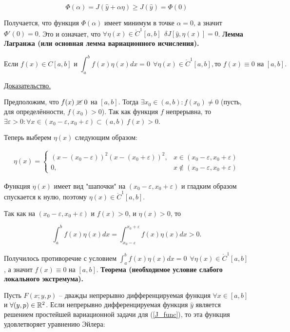 $$
\Phi(\alpha) = J(\widehat{y} + \alpha \eta) \geqslant 
J(\widehat{y}) = \Phi(0)
$$

Получается, что функция $\Phi(\alpha)$ имеет минимум в точке
$\alpha = 0$, а значит $\Phi'(0) = 0$.
Это и означает, что 
$
\forall \eta(x) \in \mathring{C}^1 [a, b] \ \ 
\delta J[\widehat{y}, \eta(x)] = 0
$.
\bigbreak
\textbf{Лемма Лагранжа (или основная лемма вариационного исчисления).}


\begin{equation*}
\text{Если } f(x) \in C [a, b] \text{ и } 
\int_a^b f(x) \eta(x) dx = 0 \ \ \forall \eta(x) \in \mathring{C}^1 [a, b],
\text{то } f(x) \equiv 0 \text{ на } [a, b].
\end{equation*}

\underline{Доказательство.}

Предположим, что $f(x) \ \cancel{\equiv}\  0$ на $[a, b]$.
Тогда $\exists x_0 \in (a, b) : f(x_0) \neq 0$ 
(пусть, для определённости, $f(x_0) > 0$).
Так как функция $f$ непрерывна, то 
$\exists \varepsilon > 0 : 
\forall x \in (x_0 - \varepsilon, x_0 + \varepsilon) \subset (a, b) \ f(x) > 0$.

Теперь выберем $\eta(x)$ следующим образом:

\begin{align*}
    \eta(x) = 
    \begin{cases}
        \left( x - (x_0 - \varepsilon) \right)^2
        \left( x - (x_0 + \varepsilon) \right)^2,
        &x \in (x_0 - \varepsilon, x_0 + \varepsilon)\\
        0, & x \notin (x_0 - \varepsilon, x_0 + \varepsilon)
    \end{cases}
\end{align*}

Функция $\eta(x)$ имеет вид "шапочки" на 
$(x_0 - \varepsilon, x_0 + \varepsilon)$ 
и гладким образом спускается к нулю, 
поэтому $\eta(x) \in \mathring{C}^1 [a, b]$.

Так как на $(x_0 - \varepsilon, x_0 + \varepsilon)$ и $f(x) > 0$, 
и $\eta(x) > 0$, то

$$
\int_a^b f(x) \eta(x) dx = 
\int_{x_0 - \varepsilon}^{x_0 + \varepsilon} f(x) \eta(x) dx > 0.
$$

Получилось противоречие с условием
$\int_a^b f(x) \eta(x) dx = 0 \ \ \forall \eta(x) \in \mathring{C}^1 [a, b]$,
а значит $f(x) \equiv 0$ на $[a, b]$.
\bigbreak
\textbf{Теорема (необходимое условие слабого локального экстремума).}

Пусть $F(x; y, p)$ -- дважды непрерывно дифференцируемая функция
$\forall x \in [a, b]$ и $\forall (y, p) \in \mathbb{R}^2$.
Если непрерывно дифференцируемая функция $\widehat{y}$ является
решением простейшей вариационной задачи для (\ref{J_func}), то
эта функция удовлетворяет уравнению Эйлера:

